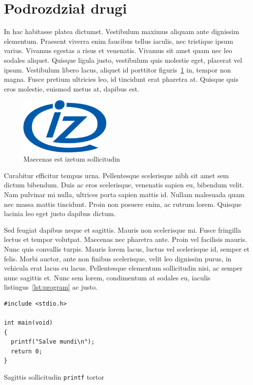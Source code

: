 \documentclass[polish,engineering]{wizthesis}
\begin{document}
\section{Podrozdział drugi}

In hac habitasse platea dictumst. Vestibulum maximus aliquam ante dignissim
elementum. Praesent viverra enim faucibus tellus iaculis, nec tristique ipsum
varius. Vivamus egestas a risus et venenatis. Vivamus sit amet quam nec leo
sodales aliquet. Quisque ligula justo, vestibulum quis molestie eget, placerat
vel ipsum. Vestibulum libero lacus, aliquet id porttitor figuris~\ref{fig:iz}
in, tempor non magna. Fusce pretium ultricies leo, id tincidunt erat pharetra
at. Quisque quis eros molestie, euismod metus at, dapibus est.
\begin{figure}[ht]
  \centering
  \includegraphics[width=0.4\textwidth]{img/iz_logo.png}
  \caption{Maecenas est izetum sollicitudin}
  \label{fig:iz}
\end{figure}

Curabitur efficitur tempus urna. Pellentesque scelerisque nibh sit amet sem
dictum bibendum. Duis ac eros scelerisque, venenatis sapien eu, bibendum velit.
Nam pulvinar mi nulla, ultrices porta sapien mattis id. Nullam malesuada quam
nec massa mattis tincidunt. Proin non posuere enim, ac rutrum lorem. Quisque
lacinia leo eget justo dapibus dictum.

Sed feugiat dapibus neque et sagittis. Mauris non scelerisque mi. Fusce
fringilla lectus et tempor volutpat. Maecenas nec pharetra ante. Proin vel
facilisis mauris. Nunc quis convallis turpis. Mauris lorem lacus, luctus vel
scelerisque id, semper et felis. Morbi auctor, ante non finibus scelerisque,
velit leo dignissim purus, in vehicula erat lacus eu lacus. Pellentesque
elementum sollicitudin nisi, ac semper nunc sagittis et. Nunc sem lorem,
condimentum at sodales eu, iaculis listingus~\ref{lst:program} ac justo.
\begin{listing}[H]
  \begin{verbatim}
#include <stdio.h>

int main(void)
{
  printf("Salve mundi\n");
  return 0;
}
  \end{verbatim}
  \caption{Sagittis sollicitudin \texttt{printf} tortor}
  \label{lst:program}
\end{listing}
\end{document}
